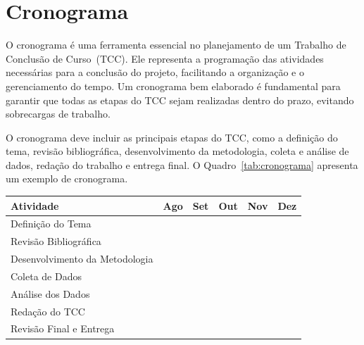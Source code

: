
\chapter{Cronograma}
\label{cap:cronograma}

O cronograma é uma ferramenta essencial no planejamento de um Trabalho de Conclusão de Curso~(TCC). Ele representa a programação das atividades necessárias para a conclusão do projeto, facilitando a organização e o gerenciamento do tempo. Um cronograma bem elaborado é fundamental para garantir que todas as etapas do TCC sejam realizadas dentro do prazo, evitando sobrecargas de trabalho.

O cronograma deve incluir as principais etapas do TCC, como a definição do tema, revisão bibliográfica, desenvolvimento da metodologia, coleta e análise de dados, redação do trabalho e entrega final. O Quadro~\ref{tab:cronograma} apresenta um exemplo de cronograma.

\begin{quadro}[h]
    \begin{tabular}{|p{7cm}|c|c|c|c|c|}
        \hline
        \textbf{Atividade}                      & \textbf{Ago} & \textbf{Set} & \textbf{Out} & \textbf{Nov} & \textbf{Dez} \\
        \hline\hline
        Definição do Tema                      & \cellcolor{black}  &  &  &  &  \\\hline
        Revisão Bibliográfica                  & \cellcolor{black}  & \cellcolor{black}  &  &  &  \\\hline
        Desenvolvimento da Metodologia         &  & \cellcolor{black}  & \cellcolor{black}  &  &  \\\hline
        Coleta de Dados                        &  &  & \cellcolor{black}  & \cellcolor{black}  &  \\\hline
        Análise dos Dados                      &  &  &  & \cellcolor{black}  & \cellcolor{black}  \\\hline
        Redação do TCC                        &  &  &  & \cellcolor{black}  & \cellcolor{black}  \\\hline
        Revisão Final e Entrega                &  &  &  &  & \cellcolor{black}  \\
        \hline
    \end{tabular}
    \vspace{0.2cm}
    \fonteautor
\end{quadro}
